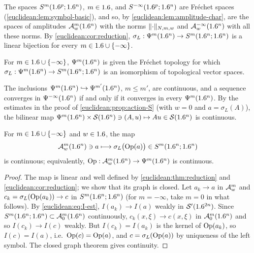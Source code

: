 The spaces $S^m(1.6^p;1.6^n)$, $m\in1.6$, and $S^{-\infty}(1.6^p;1.6^n)$ are
Fr\'echet spaces (\cref{euclidean:lem:symbol-basic}), and so, by
\cref{euclidean:lem:amplitude-char}, are the spaces of amplitudes
$\mathcal{A}^{m}_{w}(1.6^n)$ with the norms $\lVert \cdot\rVert_{N,m,w}$ and $\mathcal{A}^{-\infty}_{w}(1.6^n)$
with all these norms. By \cref{euclidean:cor:reduction},
$\sigma_L:\Psi^{m}(1.6^n)\to S^m(1.6^n;1.6^n)$ is a linear bijection for every
$m\in1.6\cup\{-\infty\}$.

\begin{definition}\label{euclidean:def:psido-topology}
  For $m\in1.6\cup\{-\infty\}$, $\Psi^{m}(1.6^n)$ is given the Fr\'echet
  topology for which $\sigma_L:\Psi^{m}(1.6^n)\to S^m(1.6^n;1.6^n)$ is an
  isomorphism of topological vector spaces.
\end{definition}

The inclusions $\Psi^{m}(1.6^n)\hookrightarrow\Psi^{m'}(1.6^n)$, $m\le m'$, are
continuous, and a sequence converges in $\Psi^{-\infty}(1.6^n)$ if and only
if it converges in every $\Psi^{m}(1.6^n)$. By the estimates in the proof of
\cref{euclidean:prop:action-S} (with $w=0$ and $a=\sigma_L(A)$), the bilinear
map $\Psi^{m}(1.6^n)\times\mathcal{S}(1.6^n)\ni(A,u)\mapsto Au\in\mathcal{S}(1.6^n)$ is
continuous.

\begin{proposition}\label{euclidean:prop:reduction-continuous}
  For $m\in1.6\cup\{-\infty\}$ and $w\in1.6$, the map
  \begin{equation*}
    \mathcal{A}^{m}_{w}(1.6^n)\ni a\longmapsto\sigma_L\bigl(\operatorname{Op}(a)\bigr)\in S^m(1.6^n;1.6^n)
  \end{equation*}
  is continuous; equivalently, $\operatorname{Op}:\mathcal{A}^{m}_{w}(1.6^n)\to\Psi^{m}(1.6^n)$ is
  continuous.
\end{proposition}
\begin{proof}
  The map is linear and well defined by \cref{euclidean:thm:reduction} and
  \cref{euclidean:cor:reduction}; we show that its graph is closed. Let
  $a_k\to a$ in $\mathcal{A}^{m}_{w}$ and $c_k=\sigma_L(\operatorname{Op}(a_k))\to c$ in
  $S^m(1.6^n;1.6^n)$ (for $m=-\infty$, take $m=0$ in what follows). By
  \eqref{euclidean:eq:I-est}, $I(a_k)\to I(a)$ weakly in $\mathcal{S}'(1.6^{2n})$.
  Since $S^m(1.6^n;1.6^n)\subset\mathcal{A}^{m}_{0}(1.6^n)$ continuously,
  $c_k(x,\xi)\to c(x,\xi)$ in $\mathcal{A}^{m}_{0}(1.6^n)$ and so $I(c_k)\to I(c)$ weakly.
  But $I(c_k)=I(a_k)$ is the kernel of $\operatorname{Op}(a_k)$, so $I(c)=I(a)$, i.e.\
  $\operatorname{Op}(c)=\operatorname{Op}(a)$, and $c=\sigma_L(\operatorname{Op}(a))$ by uniqueness of the left
  symbol. The closed graph theorem gives continuity.
\end{proof}


